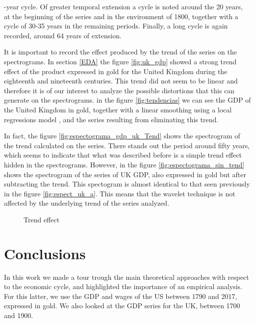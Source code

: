 \documentclass[a4paper]{article}
\begin{document}
-year cycle. Of greater temporal extension a cycle is noted around the 20 years, at the beginning of the series and in the environment of 1800, together with a cycle of 30-35 years in the remaining periods. Finally, a long cycle is again recorded, around 64 years of extension.

It is important to record the effect produced by the trend of the series on the spectrograms. In section \ref{EDA} the figure \ref{fig:uk_gdp} showed a strong trend effect of the product expressed in gold for the United Kingdom during the eighteenth and nineteenth centuries. This trend did not seem to be linear and therefore it is of our interest to analyze the possible distortions that this can generate on the spectrograms. in the figure \ref{fig:tendencias} we can see the GDP of the United Kingdom in gold, together with a linear smoothing using a local regressions model \citep{Shyu1992}, and the series resulting from eliminating this trend.

In fact, the figure \ref{fig:espectograma_gdp_uk_Tend} shows the spectrogram of the trend calculated on the series. There stands out the period around fifty years, which seems to indicate that what was described before is a simple trend effect hidden in the spectrograms. However, in the figure \ref{fig:espectograma_sin_tend} shows the spectrogram of the series of UK GDP, also expressed in gold but after subtracting the trend. This spectogram is almost identical to that seen previously in the figure \ref{fig:espect_uk_a}. This means that the wavelet technique is not affected by the underlying trend of the series analyzed.

\begin{figure}[H]
	\centering
	\caption{Trend effect} \label{fig:espect_tendencias}

\end{figure}

\section{Conclusions}

In this work we made a tour trough the main theoretical approaches with respect to the economic cycle, and highlighted the importance of an empirical analysis. For this latter, we use the GDP and wages of the US between 1790 and 2017, expressed in gold. We also looked at the GDP series for the UK, between 1700 and 1900.
\end{document}
